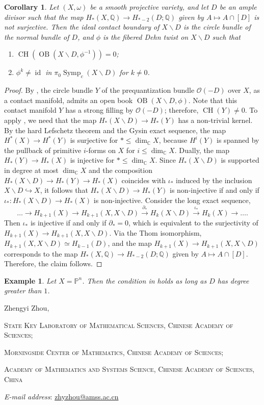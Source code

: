 \documentclass[11pt]{amsart}
\makeatletter
\numberwithin{equation}{section}
\newtheorem{corollary}[theorem]{\textbf{Corollary}}
\newtheorem{example}[theorem]{\textbf{Example}}
\def\C{{\mathbb C}}
\def\Q{{\mathbb Q}}
\def\cO{{\mathcal O}}
\DeclareMathOperator{\Id}{id}
\DeclareMathOperator{\symp}{Symp}
\DeclareMathOperator{\OB}{OB}
\DeclareMathOperator{\CH}{CH}
\newcommand{\Addresses}{{
		\bigskip
		\footnotesize

	    Zhengyi Zhou, \par\nopagebreak
        \textsc{State Key Laboratory of Mathematical Sciences, Chinese Academy of Sciences;}\par\nopagebreak
	    \textsc{Morningside Center of Mathematics, Chinese Academy of Sciences;}\par\nopagebreak
         \textsc{Academy of Mathematics and Systems Science, Chinese Academy of Sciences, China}\par\nopagebreak
		\textit{E-mail address}: \href{mailto:zhyzhou@amss.ac.cn}{zhyzhou@amss.ac.cn}

}}
\makeatother
\begin{document}
\begin{corollary}\label{cor:OB}
Let $(X,\omega)$ be a smooth projective variety, and let $D$ be an ample divisor such that the map $H_{*}(X,\Q)\to H_{*-2}(D;\Q)$ given by $A \mapsto A\cap [D]$ is not surjective. Then the ideal contact boundary of $X\backslash D$ is the circle bundle of the normal bundle of $D$, and $\phi$ is the fibered Dehn twist on $X\backslash D$ such that
\begin{enumerate}
	\item $\CH(\OB(X\backslash D,\phi^{-1}))=0$;
	\item $\phi^k\ne \Id$ in $\pi_0 \symp_c(X\backslash D)$ for $k\ne 0$.
\end{enumerate}
\end{corollary}
\begin{proof}
    By \cite[Theorem 1.1]{zbMATH06562001}, the circle bundle $Y$ of the prequantization bundle $\cO(-D)$ over $X$, as a contact manifold, admits an open book $\OB(X\backslash D, \phi)$. Note that this contact manifold $Y$ has a strong filling by $\cO(-D)$; therefore, $\CH(Y)\ne 0$. To apply , we need that the map $H_*(X\backslash D) \to H_*(Y)$ has a non-trivial kernel. By the hard Lefschetz theorem and the Gysin exact sequence, the map $H^*(X)\to H^*(Y)$ is surjective for $*\le \dim_{\C}X$, because $H^i(Y)$ is spanned by the pullback of primitive $i$-forms on $X$ for $i\le \dim_{\C}X$. Dually, the map $H_*(Y)\to H_*(X)$ is injective for $*\le \dim_{\C}X$. Since $H_*(X\backslash D)$ is supported in degree at most $\dim_{\C}X$ and the composition $H_*(X\backslash D) \to H_*(Y)\to H_*(X)$ coincides with $\iota_*$ induced by the inclusion $X\backslash D \hookrightarrow X$, it follows that $H_*(X\backslash D) \to H_*(Y)$ is non-injective if and only if $\iota_*:H_*(X\backslash D) \to H_*(X)$ is non-injective. Consider the long exact sequence,
    $$\ldots\to H_{k+1}(X)\to H_{k+1}(X,X\backslash D) \stackrel{\partial_*}{\to} H_k(X\backslash D) \stackrel{\iota_*}{\to} H_k(X) \to \ldots.$$
    Then $\iota_*$ is injective if and only if $\partial_*=0$, which is equivalent to the surjectivity of $H_{k+1}(X)\to H_{k+1}(X,X\backslash D)$. Via the Thom isomorphism, $H_{k+1}(X,X\backslash D)\simeq H_{k-1}(D)$, and the map $H_{k+1}(X)\to H_{k+1}(X,X\backslash D)$ corresponds to the map $H_{*}(X,\Q)\to H_{*-2}(D;\Q)$ given by $A \mapsto A\cap [D]$. Therefore, the claim follows.
\end{proof}

\begin{example}
    Let $X=\mathbb{P}^n$. Then the condition in  holds as long as $D$ has degree greater than $1$.
\end{example}
 

\Addresses
\end{document}
